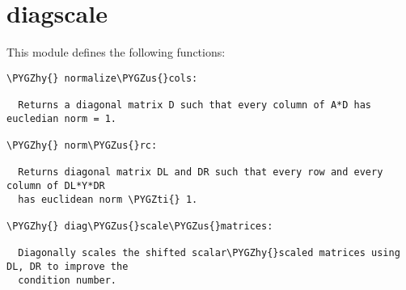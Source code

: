 \documentclass[letterpaper,10pt,english]{sphinxmanual}
\def\PYGZus{\char`\_}
\def\PYGZhy{\char`\-}
\def\PYGZti{\char`\~}
\begin{document}
\section{diagscale}
\label{index:module-diagscale}\label{index:diagscale}
This module defines the following functions:

\begin{Verbatim}[commandchars=\\\{\}]
\PYGZhy{} normalize\PYGZus{}cols:

  Returns a diagonal matrix D such that every column of A*D has eucledian norm = 1. 
  
\PYGZhy{} norm\PYGZus{}rc:

  Returns diagonal matrix DL and DR such that every row and every column of DL*Y*DR
  has euclidean norm \PYGZti{} 1.

\PYGZhy{} diag\PYGZus{}scale\PYGZus{}matrices:

  Diagonally scales the shifted scalar\PYGZhy{}scaled matrices using DL, DR to improve the
  condition number.
\end{Verbatim}
\end{document}
